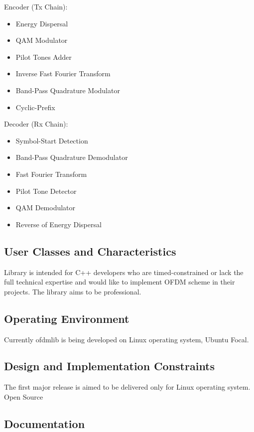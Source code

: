 \documentclass[]{report}
\begin{document}
Encoder (Tx Chain):

\begin{itemize}
	\item Energy Dispersal
	\item QAM Modulator
	\item Pilot Tones Adder
	\item Inverse Fast Fourier Transform
	\item Band-Pass Quadrature Modulator
	\item Cyclic-Prefix
\end{itemize}


Decoder (Rx Chain):

\begin{itemize}
	\item Symbol-Start Detection
	\item Band-Pass Quadrature Demodulator
	\item Fast Fourier Transform
	\item Pilot Tone Detector
	\item QAM Demodulator
	\item Reverse of Energy Dispersal
\end{itemize}


\subsection{User Classes and Characteristics}

Library is intended for C++ developers who are timed-constrained or lack the full technical expertise and would like to implement OFDM scheme in their projects. The library aims to be professional.


\subsection{Operating Environment}

Currently ofdmlib is being developed on Linux operating system, Ubuntu Focal.

\subsection{Design and Implementation Constraints}

The first major release is aimed to be delivered only for Linux operating system. 
Open Source


\subsection{Documentation}
\end{document}
